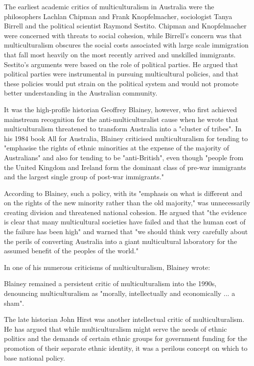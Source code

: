 The earliest academic critics of multiculturalism in Australia were the
philosophers Lachlan Chipman and Frank Knopfelmacher, sociologist Tanya
Birrell and the political scientist Raymond Sestito. Chipman and
Knopfelmacher were concerned with threats to social cohesion, while
Birrell's concern was that multiculturalism obscures the social costs
associated with large scale immigration that fall most heavily on the
most recently arrived and unskilled immigrants. Sestito's arguments were
based on the role of political parties. He argued that political parties
were instrumental in pursuing multicultural policies, and that these
policies would put strain on the political system and would not promote
better understanding in the Australian community.

It was the high-profile historian Geoffrey Blainey, however, who first
achieved mainstream recognition for the anti-multiculturalist cause when
he wrote that multiculturalism threatened to transform Australia into a
"cluster of tribes". In his 1984 book All for Australia, Blainey
criticised multiculturalism for tending to "emphasise the rights of
ethnic minorities at the expense of the majority of Australians" and
also for tending to be "anti-British", even though "people from the
United Kingdom and Ireland form the dominant class of pre-war immigrants
and the largest single group of post-war immigrants."

According to Blainey, such a policy, with its "emphasis on what is
different and on the rights of the new minority rather than the old
majority," was unnecessarily creating division and threatened national
cohesion. He argued that "the evidence is clear that many multicultural
societies have failed and that the human cost of the failure has been
high" and warned that "we should think very carefully about the perils
of converting Australia into a giant multicultural laboratory for the
assumed benefit of the peoples of the world."

In one of his numerous criticisms of multiculturalism, Blainey wrote:

Blainey remained a persistent critic of multiculturalism into the 1990s,
denouncing multiculturalism as "morally, intellectually and economically
... a sham".

The late historian John Hirst was another intellectual critic of
multiculturalism. He has argued that while multiculturalism might serve
the needs of ethnic politics and the demands of certain ethnic groups
for government funding for the promotion of their separate ethnic
identity, it was a perilous concept on which to base national policy.

